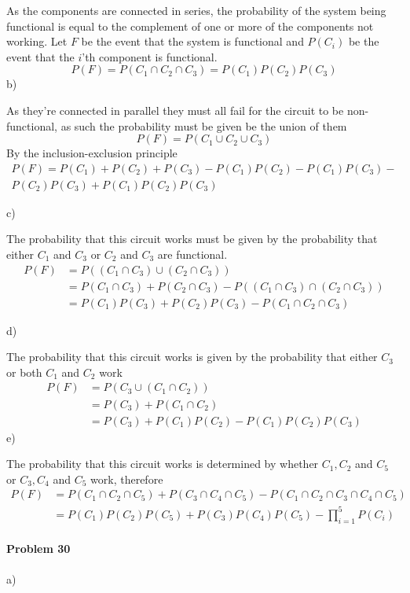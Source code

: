 As the components are connected in series, the probability of the system being functional is equal to the complement of one or more of the components not working. Let $F$ be the event that the system is functional and $P(C_i)$ be the event that the $i$'th component is functional.
\[
    P(F)=P(C_1\cap C_2\cap C_3)=P(C_1)P(C_2)P(C_3)
\]
b)

As they're connected in parallel they must all fail for the circuit to be non-functional, as such the probability must be given be the union of them
\[
    P(F)=P(C_1\cup C_2\cup C_3)
\]
By the inclusion-exclusion principle
\begin{equation*}
    \begin{gathered}
        P(F)=P(C_1)+P(C_2)+P(C_3)-P(C_1)P(C_2)-P(C_1)P(C_3)- \\
        P(C_2)P(C_3)+P(C_1)P(C_2)P(C_3)
    \end{gathered}
\end{equation*}

c)

The probability that this circuit works must be given by the probability that either $C_1$ and $C_3$ or $C_2$ and $C_3$ are functional.
\begin{align*}
    P(F)&=P((C_1\cap C_3)\cup(C_2\cap C_3)) \\
        &=P(C_1\cap C_3)+P(C_2\cap C_3)-P((C_1\cap C_3)\cap(C_2\cap C_3)) \\
        &=P(C_1)P(C_3)+P(C_2)P(C_3)-P(C_1\cap C_2\cap C_3)
\end{align*}

d)

The probability that this circuit works is given by the probability that either $C_3$ or both $C_1$ and $C_2$ work
\begin{align*}
    P(F)&=P(C_3\cup(C_1\cap C_2)) \\
        &=P(C_3)+P(C_1\cap C_2) \\
        &=P(C_3)+P(C_1)P(C_2)-P(C_1)P(C_2)P(C_3)
\end{align*}
e)

The probability that this circuit works is determined by whether $C_1,C_2$ and $C_5$ or $C_3,C_4$ and $C_5$ work, therefore
\begin{align*}
    P(F)&=P(C_1\cap C_2\cap C_5)+P(C_3\cap C_4\cap C_5)-P(C_1\cap C_2\cap C_3\cap C_4\cap C_5) \\
        &=P(C_1)P(C_2)P(C_5)+P(C_3)P(C_4)P(C_5)-\prod_{i=1}^{5}P(C_i)
\end{align*}
\paragraph{Problem 30}
a) 

